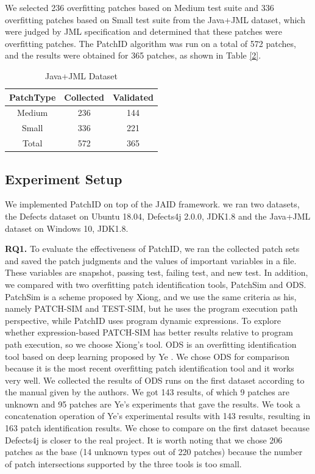 We selected 236 overfitting patches based on Medium test suite and 336 overfitting patches based on Small test suite from the Java+JML dataset, which were judged by JML specification and determined that these patches were overfitting patches. The PatchID algorithm was run on a total of 572 patches, and the results were obtained for 365 patches, as shown in Table \ref{2}.
\begin{table}[ht]
	
		\begin{minipage}{175px}
			\caption{Java+JML Dataset}\label{tab2}%
			\begin{tabular}{ccc}
				\toprule
				PatchType & Collected & Validated \\
				\midrule
				Medium    &236 &144 \\
				Small    &336 &221 \\
				Total   &572 &365 \\
			\bottomrule
			\end{tabular}
		\end{minipage}
	
\end{table}
\subsection{Experiment Setup}\label{5.2}
We implemented PatchID on top of the JAID\cite{ref57} framework. we ran two datasets, the Defects dataset on Ubuntu 18.04, Defects4j 2.0.0, JDK1.8 and the Java+JML dataset on Windows 10, JDK1.8.

\textbf{RQ1.} To evaluate the effectiveness of PatchID, we ran the collected patch sets and saved the patch judgments and the values of important variables in a file. These variables are snapshot, passing test, failing test, and new test. In addition, we compared with two overfitting patch identification tools, PatchSim and ODS. PatchSim is a scheme proposed by Xiong, and we use the same criteria as his, namely PATCH-SIM and TEST-SIM, but he uses the program execution path perspective, while PatchID uses program dynamic expressions. To explore whether expression-based PATCH-SIM has better results relative to program path execution, so we choose Xiong's tool. ODS is an overfitting identification tool based on deep learning proposed by Ye \cite{ref56}. We chose ODS for comparison because it is the most recent overfitting patch identification tool and it works very well. We collected the results of ODS runs on the first dataset according to the manual given by the authors. We got 143 results, of which 9 patches are unknown and 95 patches are Ye's experiments that gave the results.  We took a concatenation operation of Ye's experimental results with 143 results, resulting in 163 patch identification results. We chose to compare on the first dataset because Defects4j is closer to the real project. It is worth noting that we chose 206 patches as the base (14 unknown types out of 220 patches) because the number of patch intersections supported by the three tools is too small.

